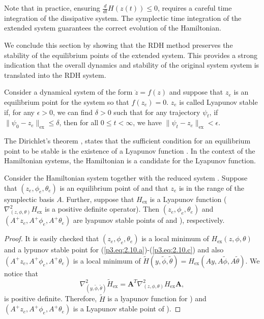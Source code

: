 Note that in practice, ensuring $\frac d {dt} H(z(t)) \leq 0$, requires a careful time integration of the dissipative system. The symplectic time integration of the extended system guarantees the correct evolution of the Hamiltonian.

We conclude this section by showing that the RDH method preserves the stability of the equilibrium points of the extended system. This provides a strong indication that the overall dynamics and stability of the original system system is translated into the RDH system. 

\begin{definition}
Consider a dynamical system of the form $\dot z = f( z)$ and suppose that $z_e$ is an equilibrium point for the system so that $ f( z_e) = 0$. $z_e$ is called Lyapunov stable if, for any $\epsilon > 0$, we can find $\delta > 0$ such that for any trajectory $\psi_t$, if $\| \psi_0 - z_e \|_{\text{ex}} \leq \delta$, then for all $0 \leq t < \infty$, we have $\| \psi_t - z_e \|_{\text{ex}} < \epsilon$.
\end{definition}

The Dirichlet's theorem \cite{bhatia2002stability}, states that the sufficient condition for an equilibrium point to be stable is the existence of a Lyapunov function \cite{bhatia2002stability}. In the context of the Hamiltonian systems, the Hamiltonian is a candidate for the Lyapunov function.

\begin{theorem}
Consider the Hamiltonian system  together with the reduced system . Suppose that $(z_e,\phi_e,\theta_e)$ is an equilibrium point of  and that $z_e$ is in the range of the symplectic basis $A$. Further, suppose that $H_{\text{ex}}$ is a Lyapunov function ($\nabla^2_{(z,\phi,\theta)}H_{\text{ex}}$ is a positive definite operator). Then $(z_e,\phi_e,\theta_e)$ and $(A^+z_e,A^+\phi_e,A^+\theta_e)$ are lyapunov stable points of  and ), respectively.
\end{theorem}
\begin{proof} It is easily checked that $(z_e,\phi_e,\theta_e)$ is a local minimum of $H_{\text{ex}}(z,\phi,\theta)$ and a lypunov stable point for (\ref{p3.eq:2.10.a})-(\ref{p3.eq:2.10.c}) and also $(A^+z_e,A^+\phi_e,A^+\theta_e)$ is a local minimum of $\tilde H(y,\tilde \phi,\tilde \theta) = H_{\text{ex}}(Ay,A\tilde \phi,A\tilde \theta)$. We notice that
\begin{equation}
	\nabla^2_{(y,\tilde \phi,\tilde \theta)}\tilde H_{\text{ex}} = \mathbf A^T \nabla^2_{(z,\phi,\theta)}H_{\text{ex}} \mathbf A,
\end{equation}
is positive definite. Therefore, $\tilde H$ is a lyapunov function for ) and $(A^+z_e,A^+\phi_e,A^+\theta_e)$ is a Lyapunov stable point of  ).
\end{proof}






